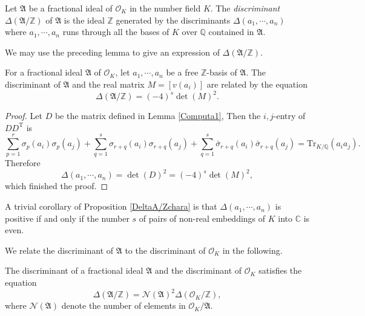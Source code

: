 \begin{definition}
Let $\mathfrak{A}$ be a fractional ideal of $\mathcal{O}_K$ in the number field $K$. The \textit{discriminant} $\Delta(\mathfrak{A}/\mathbb{Z})$ of $\mathfrak{A}$ is the ideal $\mathbb{Z}$ generated by the discriminants $\Delta(a_1,\cdots,a_n)$ where $a_1,\cdots,a_n$ runs through all the bases of $K$ over $\mathbb{Q}$ contained in $\mathfrak{A}$.
\end{definition}
We may use the preceding lemma to give an expression of $\Delta(\mathfrak{A}/\mathbb{Z})$.
\begin{proposition}\label{DeltaA/Zchara}
For a fractional ideal $\mathfrak{A}$ of $\mathcal{O}_K$, let $a_1,\cdots,a_n$ be a free $\mathbb{Z}$-basis of $\mathfrak{A}$. The discriminant of $\mathfrak{A}$ and the real matrix $M=[v(a_i)]$ are related by the equation 
$$
\Delta \left( \mathfrak{A} /\mathbb{Z} \right) =\left( -4 \right) ^s\det \left( M \right) ^2.
$$
\end{proposition}
\begin{proof}
Let $D$ be the matrix defined in Lemma \ref{Computa1}, Then the $i,j$-entry of $DD^\mathrm{T}$ is 
$$
\sum_{p=1}^r{\sigma _p\left( a_i \right) \sigma _p\left( a_j \right)}+\sum_{q=1}^s{\sigma _{r+q}\left( a_i \right) \sigma _{r+q}\left( a_j \right)}+\sum_{q=1}^s{\bar{\sigma}_{r+q}\left( a_i \right) \bar{\sigma}_{r+q}\left( a_j \right)}=\mathrm{Tr}_{K/\mathbb{Q}}\left( a_ia_j \right) .
$$
Therefore 
$$
\Delta \left( a_1,\cdots ,a_n \right) =\det \left( D \right) ^2=\left( -4 \right) ^s\det \left( M \right) ^2,
$$
which finished the proof.
\end{proof}
A trivial corollary of Proposition \ref{DeltaA/Zchara} is that $\Delta(a_1,\cdots,a_n)$ is positive if and only if the number $s$ of pairs of non-real embeddings of $K$ into $\mathbb{C}$ is even.\par
We relate the discriminant of $\mathfrak{A}$ to the discriminant of $\mathcal{O}_K$ in the following.
\begin{proposition}\label{N(A)^2Delta(R/Z)}
The discriminant of a fractional ideal $\mathfrak{A}$ and the discriminant of $\mathcal{O}_K$ satisfies the equation 
$$
\Delta \left( \mathfrak{A} /\mathbb{Z} \right) =\mathcal{N} \left( \mathfrak{A} \right) ^2\Delta \left( \mathcal{O} _K/\mathbb{Z} \right) ,
$$
where $\mathcal{N}(\mathfrak{A})$ denote the number of elements in $\mathcal{O}_K/\mathfrak{A}$.
\end{proposition}
